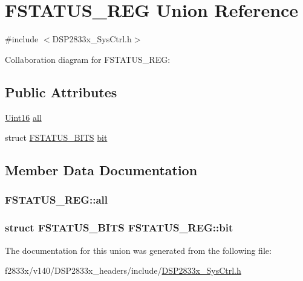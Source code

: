 \hypertarget{union_f_s_t_a_t_u_s___r_e_g}{}\section{F\+S\+T\+A\+T\+U\+S\+\_\+\+R\+E\+G Union Reference}
\label{union_f_s_t_a_t_u_s___r_e_g}


{\ttfamily \#include $<$D\+S\+P2833x\+\_\+\+Sys\+Ctrl.\+h$>$}



Collaboration diagram for F\+S\+T\+A\+T\+U\+S\+\_\+\+R\+E\+G\+:
\subsection*{Public Attributes}
\begin{DoxyCompactItemize}
\item 
\hyperlink{_d_s_p2833x___device_8h_a59a9f6be4562c327cbfb4f7e8e18f08b}{Uint16} \hyperlink{union_f_s_t_a_t_u_s___r_e_g_a1cf9569655267b3df3a7fadcb904cd65}{all}
\item 
struct \hyperlink{struct_f_s_t_a_t_u_s___b_i_t_s}{F\+S\+T\+A\+T\+U\+S\+\_\+\+B\+I\+T\+S} \hyperlink{union_f_s_t_a_t_u_s___r_e_g_abd9dab32178d2480a2be0f8c05560aad}{bit}
\end{DoxyCompactItemize}


\subsection{Member Data Documentation}
\hypertarget{union_f_s_t_a_t_u_s___r_e_g_a1cf9569655267b3df3a7fadcb904cd65}{}
\subsubsection[{all}]{ F\+S\+T\+A\+T\+U\+S\+\_\+\+R\+E\+G\+::all}\label{union_f_s_t_a_t_u_s___r_e_g_a1cf9569655267b3df3a7fadcb904cd65}
\hypertarget{union_f_s_t_a_t_u_s___r_e_g_abd9dab32178d2480a2be0f8c05560aad}{}
\subsubsection[{bit}]{\setlength{\rightskip}{0pt plus 5cm}struct {\bf F\+S\+T\+A\+T\+U\+S\+\_\+\+B\+I\+T\+S} F\+S\+T\+A\+T\+U\+S\+\_\+\+R\+E\+G\+::bit}\label{union_f_s_t_a_t_u_s___r_e_g_abd9dab32178d2480a2be0f8c05560aad}


The documentation for this union was generated from the following file\+:\begin{DoxyCompactItemize}
\item 
f2833x/v140/\+D\+S\+P2833x\+\_\+headers/include/\hyperlink{_d_s_p2833x___sys_ctrl_8h}{D\+S\+P2833x\+\_\+\+Sys\+Ctrl.\+h}\end{DoxyCompactItemize}
